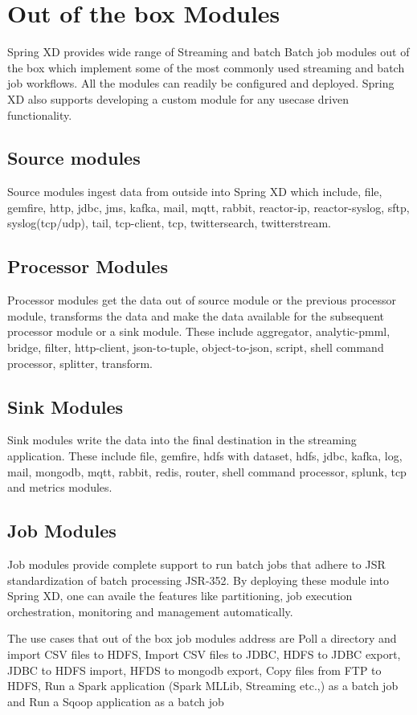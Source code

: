 \section{Out of the box Modules}
 Spring XD provides wide range of Streaming and batch Batch job modules out of the box which implement 
some of the most commonly used streaming and batch job workflows. All the modules can readily be configured and deployed.
Spring XD also supports developing a custom module for any usecase driven functionality.

\subsection{Source modules}

  Source modules ingest data from outside into Spring XD which include, file, gemfire,
http, jdbc, jms, kafka, mail, mqtt, rabbit, reactor-ip, reactor-syslog, sftp, syslog(tcp/udp),
tail, tcp-client, tcp, twittersearch, twitterstream.

\subsection{Processor Modules}
  Processor modules get the data out of source module or the previous processor module, transforms
the data and make the data available for the subsequent processor module or a sink module.
These include aggregator, analytic-pmml, bridge, filter, http-client, json-to-tuple,
object-to-json, script, shell command processor, splitter, transform.

\subsection{Sink Modules}
  Sink modules write the data into the final destination in the streaming application.
These include file, gemfire, hdfs with dataset, hdfs, jdbc, kafka, log, mail, mongodb,
mqtt, rabbit, redis, router, shell command processor, splunk, tcp and metrics modules.

\subsection{Job Modules}

  Job modules provide complete support to run batch jobs that adhere to JSR standardization of
batch processing JSR-352. By deploying these module into Spring XD, one can availe the 
features like partitioning, job execution orchestration, monitoring and  management
automatically. 

\par

The use cases that out of the box job modules address are Poll a directory and import CSV files to HDFS, 
Import CSV files to JDBC, HDFS to JDBC export, JDBC to HDFS import, HFDS to mongodb export, Copy files from FTP to HDFS, 
Run a Spark application (Spark MLLib, Streaming etc.,) as a batch job and 
Run a Sqoop application as a batch job

